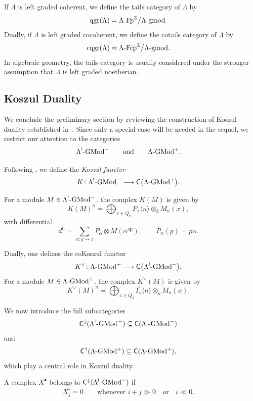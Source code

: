 \documentclass[11pt]{article}
\theoremstyle{definition}
\theoremstyle{remark}
\begin{document}
\medskip 

If \(\Lambda\) is left graded coherent, we define the tails category of
\(\Lambda\) by
\[
\operatorname{qgr}(\Lambda)
=
\Lambda\textup{-}\mathrm{Fp}^{\mathbb{Z}}
\big/
\Lambda\textup{-}\mathrm{gmod}.
\]
Dually, if \(\Lambda\) is left graded cocoherent, we define the cotails
category of \(\Lambda\) by
\[
\operatorname{cqgr}(\Lambda)
=
\Lambda\textup{-}\mathrm{Fcp}^{\mathbb{Z}}
\big/
\Lambda\textup{-}\mathrm{gmod}.
\]
In algebraic geometry, the tails category is usually considered under the
stronger assumption that \(\Lambda\) is left graded noetherian.




\subsection{Koszul Duality}
We conclude the preliminary section by reviewing the construction of Koszul duality established in~\cite{11,12}. Since only a special case will be needed in the sequel, we restrict our attention to the categories
\[
\Lambda^{!}\textup{-GMod}^{-}
\qquad\text{and}\qquad
\Lambda\textup{-GMod}^{+}.
\]

\medskip

Following \cite{8,11,12}, we define the \emph{Koszul functor}
\[
K \colon
\Lambda^{!}\textup{-GMod}^{-}
\longrightarrow
\mathsf{C}\bigl(\Lambda\textup{-GMod}^{+}\bigr).
\]

For a module
\(M\in \Lambda^{!}\textup{-GMod}^{-}\),
the complex \(K(M)\) is given by
\[
K(M)^n
=
\bigoplus_{x\in Q_0}
P_x\langle n\rangle
\otimes_k
M_n(x),
\]
with differential
\[
d^n
=
\sum_{\alpha:y\to x}
P_\alpha
\otimes
M(\alpha^{\operatorname{op}}),
\qquad
P_\alpha(p)=p\alpha.
\]

Dually, one defines the coKoszul functor 
\[
K^{\vee} \colon
\Lambda\textup{-GMod}^{+}
\longrightarrow
\mathsf{C}\bigl(\Lambda^{!}\textup{-GMod}^{-}\bigr),
\]
 For a module
\(M\in \Lambda\textup{-GMod}^{+}\),
the complex \(K^{\vee}(M)\) is given by
\[
K^{\vee}(M)^n
=
\bigoplus_{x\in Q_0}
I_x^{!}\langle n\rangle
\otimes_k
M_n(x).
\]

We now introduce the full subcategories
\[
\mathsf{C}^{\downarrow}(\Lambda^{!}\textup{-GMod}^{-})
\subseteq
\mathsf{C}(\Lambda^{!}\textup{-GMod}^{-})
\]
and
\[
\mathsf{C}^{\uparrow}(\Lambda\textup{-GMod}^{+})
\subseteq
\mathsf{C}(\Lambda\textup{-GMod}^{+}),
\]
which play a central role in Koszul duality.

A complex \(X^\bullet\) belongs to
\(\mathsf{C}^{\downarrow}(\Lambda^{!}\textup{-GMod}^{-})\)
if
\[
X^i_j=0
\qquad
\text{whenever }
i+j\gg 0
\quad\text{or}\quad
i\ll 0.
\]
\end{document}
